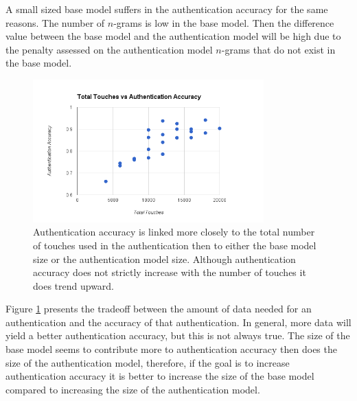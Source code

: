 \documentclass{acm_proc_article-sp}
\begin{document}
A small sized base model suffers in the authentication accuracy for the same reasons. 
The number of $n$-grams is low in the base model.  Then the difference value between the base
model and the authentication model will be high due to the penalty assessed on the authentication model
$n$-grams that do not exist in the base model. 

\begin{figure}
\centering
\includegraphics[width=3.5in]{total_touches_vs_authentication_accuracy.png}
\caption{Authentication accuracy is linked more closely to the total number of touches used in the authentication then to either the base model size or the authentication model size. Although authentication accuracy does not strictly increase with the number of touches it does trend upward.}
\label{fig:total_touches_vs_authentication_accuracy}
\end{figure}

%
Figure \ref{fig:total_touches_vs_authentication_accuracy} presents the tradeoff between the amount of data needed for an authentication and the accuracy of that authentication.
In general, more data will yield a better authentication accuracy, but this is not always true.
The size of the base model seems to contribute more to authentication accuracy then does the size of the authentication model, therefore, if the goal is to increase authentication accuracy it is better to increase the size of the base model compared to increasing the size of the authentication model.


\end{document}
